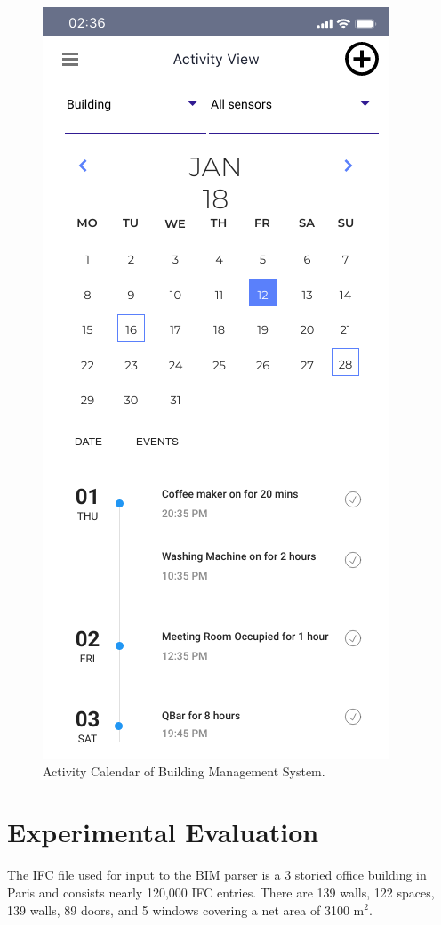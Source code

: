 \documentclass[conference]{IEEEtran}
\begin{document}
\begin{itemize}
    
    \end{itemize}  
  

\begin{figure}
\centering
  \includegraphics[width=0.59\linewidth]{./img/activityCalendar.png}
  \caption{ Activity Calendar of Building Management System.  }
  \label{fig:activityCalendar}
\end{figure}



\section{Experimental Evaluation}
\label{section:evaluation}
The IFC file used for input to the BIM parser is a 3 storied office building in Paris and consists nearly 120,000 IFC entries. There are 139 walls, 122 spaces, 139 walls, 89 doors, and 5 windows covering a net area of 3100 m$^2$.  
\end{document}
